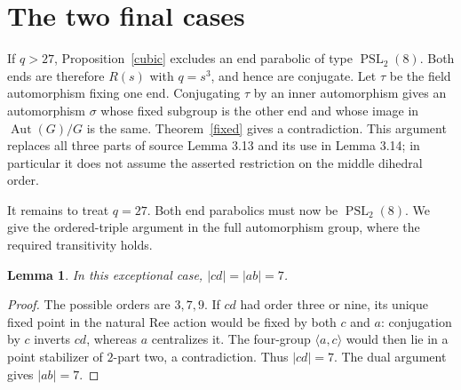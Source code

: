 \documentclass[11pt,a4paper]{article}
\newtheorem{lemma}{Lemma}
\newcommand{\gen}[1]{\langle #1\rangle}
\newcommand{\Aut}{\operatorname{Aut}}
\begin{document}
\section{The two final cases}
If $q>27$, Proposition~\ref{cubic} excludes an end parabolic of type
$\operatorname{PSL}_2(8)$. Both ends are therefore $R(s)$ with
$q=s^3$, and hence are conjugate. Let $\tau$ be the field automorphism
fixing one end. Conjugating $\tau$ by an inner automorphism gives an
automorphism $\sigma$ whose fixed subgroup is the other end and whose
image in $\Aut(G)/G$ is the same. Theorem~\ref{fixed} gives a
contradiction. This argument replaces all three parts of source
Lemma 3.13 and its use in Lemma 3.14; in particular it does not assume
the asserted restriction on the middle dihedral order.

It remains to treat $q=27$. Both end parabolics must now be
$\operatorname{PSL}_2(8)$. We give the ordered-triple argument in
the full automorphism group, where the required transitivity holds.

\begin{lemma}\label{seven}
In this exceptional case, $|cd|=|ab|=7$.
\end{lemma}
\begin{proof}
The possible orders are $3,7,9$. If $cd$ had order three or nine,
its unique fixed point in the natural Ree action would be fixed by
both $c$ and $a$: conjugation by $c$ inverts $cd$, whereas $a$
centralizes it. The four-group $\gen{a,c}$ would then lie in a point
stabilizer of $2$-part two, a contradiction. Thus $|cd|=7$.
The dual argument gives $|ab|=7$.
\end{proof}
\end{document}
